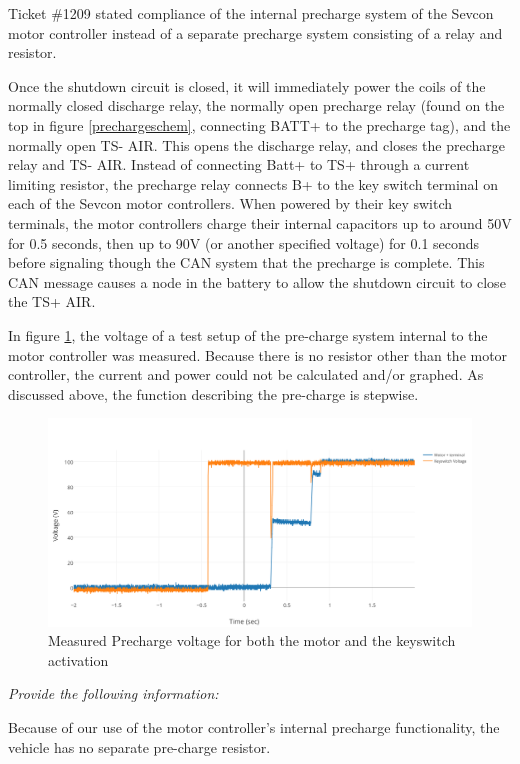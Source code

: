 \documentclass{article}
\begin{document}
    Ticket \#1209 stated compliance of the internal precharge system of the Sevcon motor controller instead of a separate precharge system consisting of a relay and resistor.

    Once the shutdown circuit is closed, it will immediately power the coils of the normally closed discharge relay, the normally open precharge relay (found on the top in figure \ref{prechargeschem}, connecting BATT+ to the precharge tag), and the normally open TS- AIR. This opens the discharge relay, and closes the precharge relay and TS- AIR. Instead of connecting Batt+ to TS+ through a current limiting resistor, the precharge relay connects B+ to the key switch terminal on each of the Sevcon motor controllers. When powered by their key switch terminals, the motor controllers charge their internal capacitors up to around 50V for 0.5 seconds, then up to 90V (or another specified voltage) for 0.1 seconds before signaling though the CAN system that the precharge is complete. This CAN message causes a node in the battery to allow the shutdown circuit to close the TS+ AIR.

    In figure \ref{prechargemeasurements}, the voltage of a test setup of the pre-charge system internal to the motor controller was measured. Because there is no resistor other than the motor controller, the current and power could not be calculated and/or graphed. As discussed above, the function describing the pre-charge is stepwise.

        \begin{figure}[H]
        \centering
        \includegraphics[width = 0.8 \textwidth]{PrechargeVoltage}
        \caption{Measured Precharge voltage for both the motor and the keyswitch activation}
        \label{prechargemeasurements}
    \end{figure}

    \textit{Provide the following information:}

    Because of our use of the motor controller's internal precharge functionality, the vehicle has no separate pre-charge resistor.
\end{document}
